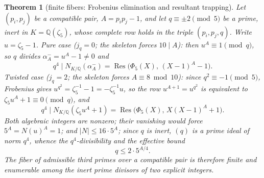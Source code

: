 \documentclass[11pt]{amsart}
\newtheorem{theorem}{Theorem}[section]
\theoremstyle{definition}
\theoremstyle{remark}
\newcommand{\Q}{\mathbb{Q}}
\newcommand{\Res}{\operatorname{Res}}
\begin{document}
\begin{theorem}[finite fibers: Frobenius elimination and resultant
trapping]\label{thm:fibers}
Let $(p_i, p_j)$ be a compatible pair, $A = p_ip_j - 1$, and let
$q \equiv \pm2 \pmod 5$ be a prime, inert in $K = \Q(\zeta_5)$, whose
complete row holds in the triple $(p_i, p_j, q)$. Write $u = \zeta_5 - 1$.
\emph{Pure case} ($j_q = 0$; the skeleton forces $10 \mid A$): then
$u^A \equiv 1 \pmod q$, so $q$ divides $\alpha_A^- = u^A - 1 \ne 0$ and
\[
q^4 \mid N_{K/\Q}(\alpha_A^-) = \Res\big(\Phi_5(X),\, (X-1)^A - 1\big).
\]
\emph{Twisted case} ($j_q = 2$; the skeleton forces $A \equiv 8 \bmod
10$): since $q^2 \equiv -1 \pmod 5$, Frobenius gives $u^{q^2} =
\zeta_5^{-1} - 1 = -\zeta_5^{-1} u$, so the row $u^{A+1} = u^{q^2}$ is
equivalent to $\zeta_5 u^A + 1 \equiv 0 \pmod q$, and
\[
q^4 \mid N_{K/\Q}(\zeta_5 u^A + 1) = \Res\big(\Phi_5(X),\, X(X-1)^A +
1\big).
\]
Both algebraic integers are nonzero; their vanishing would force
$5^A = N(u)^A = 1$; and $|N| \le 16 \cdot 5^A$; since $q$ is inert,
$(q)$ is a prime ideal of norm $q^4$, whence the $q^4$-divisibility and
the effective bound
\[
q \le 2 \cdot 5^{A/4}.
\]
The fiber of admissible third primes over a compatible pair is therefore
finite and enumerable among the inert prime divisors of two explicit
integers.
\end{theorem}
\end{document}
